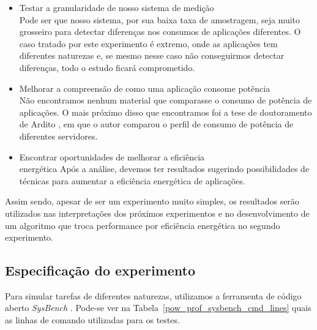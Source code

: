 \begin{itemize}
  \item Testar a granularidade de nosso sistema de medição \\
    Pode ser que nosso sistema, por sua baixa taxa de amostragem, seja muito grosseiro para detectar diferenças nos consumos de aplicações diferentes. O caso tratado por este experimento é extremo, onde as aplicações tem diferentes naturezas e, se mesmo nesse caso não conseguirmos detectar diferenças, todo o estudo ficará comprometido.

  \item Melhorar a compreensão de como uma aplicação consome potência \\
    Não encontramos nenhum material que comparasse o consumo de potência de aplicações. O mais próximo disso que encontramos foi a tese de doutoramento de Ardito \cite{ardito2014energy}, em que o autor comparou o perfil de consumo de potência de diferentes servidores.

  \item Encontrar oportunidades de melhorar a eficiência  \\energética
    Após a análise, devemos ter resultados sugerindo possibilidades de técnicas para aumentar a eficiência energética de aplicações.
\end{itemize}

Assim sendo, apesar de ser um experimento muito simples, os resultados serão utilizados nas interpretações dos próximos experimentos e no desenvolvimento de um algoritmo que troca performance por eficiência energética no segundo experimento.

\subsection{Especificação do experimento}
Para simular tarefas de diferentes naturezas, utilizamos a ferramenta de código aberto \emph{SysBench} \cite{kopytov2004sysbench}. Pode-se ver na Tabela~\ref{pow_prof_sysbench_cmd_lines} quais as linhas de comando utilizadas para os testes.

